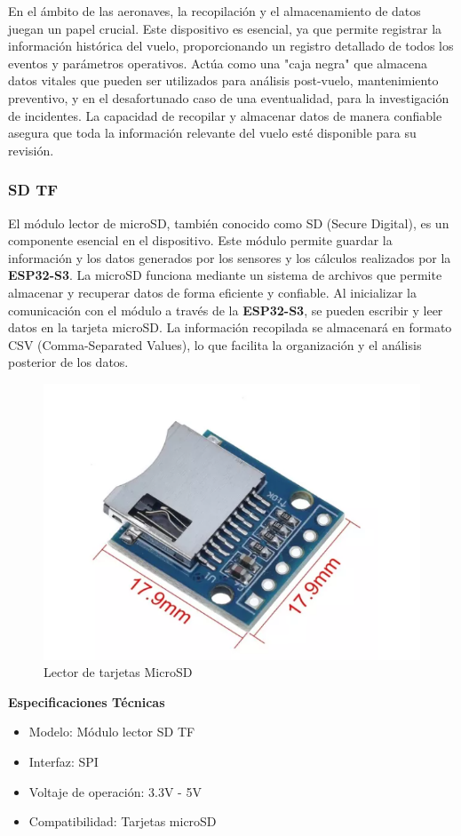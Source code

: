     En el ámbito de las aeronaves, la recopilación y el almacenamiento de datos juegan un papel crucial. Este dispositivo es esencial, ya que permite registrar la información histórica del vuelo, proporcionando un registro detallado de todos los eventos y parámetros operativos. Actúa como una "caja negra" que almacena datos vitales que pueden ser utilizados para análisis post-vuelo, mantenimiento preventivo, y en el desafortunado caso de una eventualidad, para la investigación de incidentes. La capacidad de recopilar y almacenar datos de manera confiable asegura que toda la información relevante del vuelo esté disponible para su revisión.
    \subsubsection{SD TF}

        El módulo lector de microSD, también conocido como SD (Secure Digital), es un componente esencial en el dispositivo. Este módulo permite guardar la información y los datos generados por los sensores y los cálculos realizados por la \textbf{ESP32-S3}. La microSD funciona mediante un sistema de archivos que permite almacenar y recuperar datos de forma eficiente y confiable. Al inicializar la comunicación con el módulo a través de la \textbf{ESP32-S3}, se pueden escribir y leer datos en la tarjeta microSD. La información recopilada se almacenará en formato CSV (Comma-Separated Values), lo que facilita la organización y el análisis posterior de los datos.
        \begin{figure}[H]
            \centering
            \includegraphics[width=2 in]{Imagenes/Metodologia/SD.png}
            \caption{Lector de tarjetas MicroSD}
            \label{fig:microSD}
        \end{figure}
        \textbf{Especificaciones Técnicas}
        \begin{itemize}
            \item Modelo: Módulo lector SD TF
            \item Interfaz: SPI
            \item Voltaje de operación: 3.3V - 5V
            \item  Compatibilidad: Tarjetas microSD
        \end{itemize}
